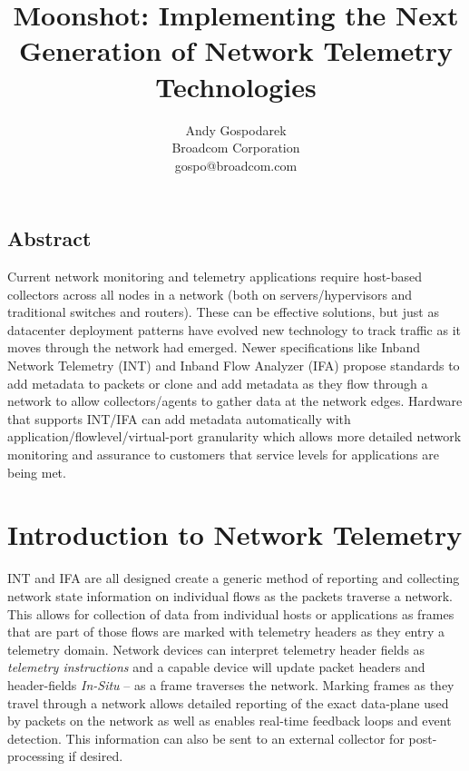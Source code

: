 \documentclass[letterpaper,twocolumn,10pt]{article}
\begin{document}
\date{}

\title{\Large \bf Moonshot: Implementing the Next Generation of Network
Telemetry Technologies}

\author{
{\rm Andy Gospodarek}\\
Broadcom Corporation\\
gospo@broadcom.com
} %

\maketitle

\subsection*{Abstract}
Current network monitoring and telemetry applications require host-based
collectors across all nodes in a network (both on servers/hypervisors
and traditional switches and routers). These can be effective solutions,
but just as datacenter deployment patterns have evolved new technology
to track traffic as it moves through the network had emerged. Newer
specifications like Inband Network Telemetry\cite{INT} (INT) and Inband
Flow Analyzer\cite{IFA} (IFA) propose standards to add metadata to
packets or clone and add metadata as they flow through a network to
allow collectors/agents to gather data at the network edges. Hardware
that supports INT/IFA can add metadata automatically with
application/flowlevel/virtual-port granularity which allows more
detailed network monitoring and assurance to customers that service
levels for applications are being met.

\section{Introduction to Network Telemetry}

INT and IFA are all designed create a generic method of reporting and
collecting network state information on individual flows as the packets
traverse a network.  This allows for collection of data from individual
hosts or applications as frames that are part of those flows are marked
with telemetry headers as they entry a telemetry domain.  Network
devices can interpret telemetry header fields as \textit{telemetry
instructions} and a capable device will update packet headers and
header-fields \textit{In-Situ} -- as a frame traverses the network.
Marking frames as they travel through a network allows detailed
reporting of the exact data-plane used by packets on the network as well
as enables real-time feedback loops and event detection.  This
information can also be sent to an external collector for
post-processing if desired.  
\end{document}
